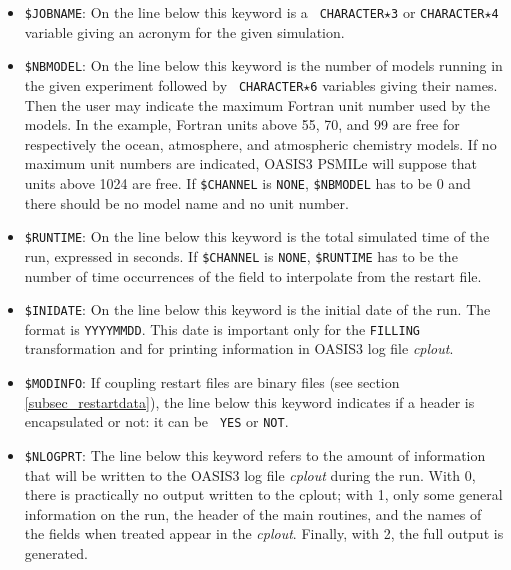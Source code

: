 \begin{itemize}
\item {\tt \$JOBNAME}: On the line below this keyword is a {\tt
CHARACTER$\star$3} or {\tt CHARACTER$\star$4} variable giving an
acronym for the given simulation.

\item {\tt \$NBMODEL}: On the line below this keyword is the number of
models running in the given experiment followed by {\tt
CHARACTER$\star$6} variables giving their names. Then the user may
indicate the maximum Fortran unit number used by the models. In the
example, Fortran units above 55, 70, and 99 are free for respectively
the ocean, atmosphere, and atmospheric chemistry models. If no
maximum unit numbers are indicated, OASIS3 PSMILe will suppose that units
above 1024 are free. If {\tt \$CHANNEL}
is {\tt NONE}, {\tt \$NBMODEL} has to be 0 and there should be no
model name and no unit number.

\item {\tt \$RUNTIME}: On the line below this keyword is the total
simulated time of the run, expressed in seconds. If {\tt \$CHANNEL}
is {\tt NONE}, {\tt \$RUNTIME} has to be the number of time occurrences
of the field to interpolate from the restart file. 

\item {\tt \$INIDATE}: On the line below this keyword is the initial
  date of the run. The format is {\tt YYYYMMDD}. This date is important only
  for the {\tt FILLING} transformation and for printing information in
  OASIS3 log file {\it cplout}.

\item {\tt \$MODINFO}: If coupling restart files are binary files (see
  section \ref{subsec_restartdata}), the line below this keyword
  indicates if a header is encapsulated or not: it can be {\tt
  YES} or {\tt NOT}.
 
\item {\tt \$NLOGPRT}: The line below this keyword refers to the
  amount of information that will be written to the OASIS3 log file
  {\it cplout} during the run. With 0, there is practically no output
  written to the cplout; with 1, only some general information on the
  run, the header of the main routines, and the names of the fields
  when treated appear in the {\it cplout}.  Finally, with 2, the full output
  is generated.


\end{itemize}
